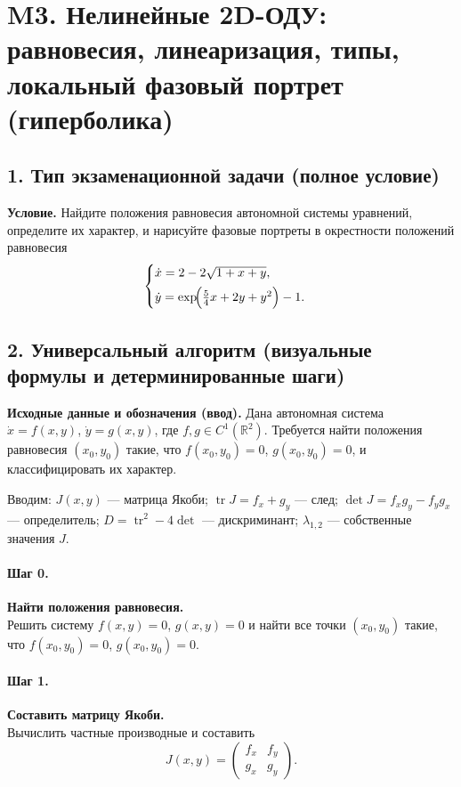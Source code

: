 \section{M3. Нелинейные 2D-ОДУ: равновесия, линеаризация, типы, локальный фазовый портрет (гиперболика)}

\subsection*{1. Тип экзаменационной задачи (полное условие)}
\textbf{Условие.} Найдите положения равновесия автономной системы уравнений, определите их характер, и нарисуйте фазовые портреты в окрестности положений равновесия
\[
\begin{cases}
\dot{x}=2-2\sqrt{1+x+y},\\[4pt]
\dot{y}=\exp\!\Bigl(\tfrac{5}{4}x+2y+y^{2}\Bigr)-1.
\end{cases}
\]

\subsection*{2. Универсальный алгоритм (визуальные формулы и детерминированные шаги)}

\textbf{Исходные данные и обозначения (ввод).} Дана автономная система \(\dot{x}=f(x,y)\), \(\dot{y}=g(x,y)\), где \(f,g\in C^1(\mathbb{R}^2)\). Требуется найти положения равновесия \((x_0,y_0)\) такие, что \(f(x_0,y_0)=0\), \(g(x_0,y_0)=0\), и классифицировать их характер.

Вводим: \(J(x,y)\) — матрица Якоби; \(\operatorname{tr}J=f_x+g_y\) — след; \(\det J=f_x g_y-f_y g_x\) — определитель; \(D=\operatorname{tr}^2-4\det\) — дискриминант; \(\lambda_{1,2}\) — собственные значения \(J\).

\paragraph{Шаг 0.} \textbf{Найти положения равновесия.}\\
Решить систему \(f(x,y)=0\), \(g(x,y)=0\) и найти все точки \((x_0,y_0)\) такие, что \(f(x_0,y_0)=0\), \(g(x_0,y_0)=0\).

\paragraph{Шаг 1.} \textbf{Составить матрицу Якоби.}\\
Вычислить частные производные и составить
\[
J(x,y)=\begin{pmatrix} f_x & f_y\\[2pt] g_x & g_y \end{pmatrix}.
\]

